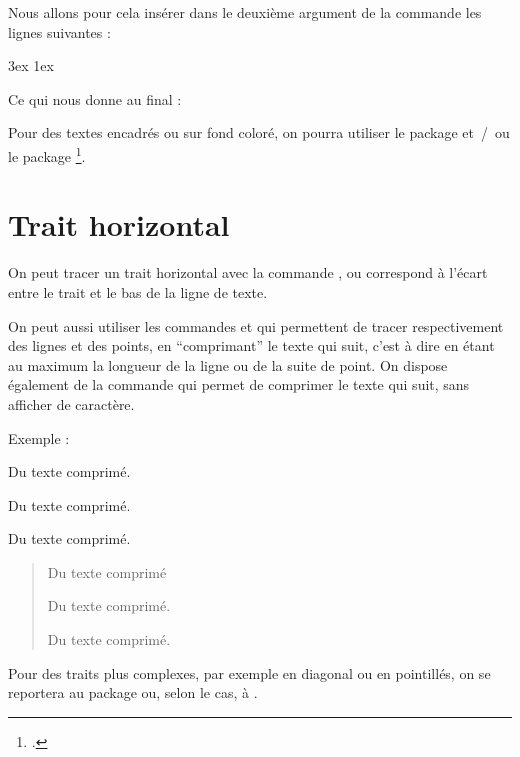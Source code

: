 Nous allons pour cela insérer dans le deuxième argument de la commande  les lignes suivantes :
\begin{latexcode}
\leftmargin 3ex
\rightmargin 1ex
\itshape
\end{latexcode}

Ce qui nous donne au final :

\begin{latexcode}
\makeatletter
\newenvironment{exemple}
               {\list{}{\listparindent 1.5em%
                        \itemindent    \listparindent
                        \leftmargin 3ex
		    \rightmargin 1ex
		    \itshape
                        \parsep        \z@ \@plus\p@}%
                \item\relax}
               {\endlist}
\makeatother
\end{latexcode}

\begin{plusloins}
Pour des textes encadrés ou sur fond coloré, on pourra utiliser le package  et~/~ou le package \footcites[On peut également consulter][qui regorge d'exemple pratique de \enquote{mise en boîte}]{frama}[on consultera en particulier][]{frama_boites}. 
\end{plusloins}

\section{Trait horizontal}\label{filets}

On peut tracer un trait horizontal avec la commande , ou  correspond à l'écart entre le trait et le bas de la ligne de texte.

On peut aussi utiliser les commandes  et  qui permettent de tracer respectivement des lignes et des points, en \enquote{comprimant} le texte qui suit, c'est à dire en étant au maximum la longueur de la ligne ou de la suite de point. On dispose également de la commande \label{hfill} qui permet de comprimer le texte qui suit, sans afficher de caractère.

Exemple :
\begin{latexcode}
\hfill	Du texte comprimé.

\hrulefill Du texte comprimé.

\dotfill Du texte comprimé.
\end{latexcode}

\begin{quotation}
\hfill Du texte comprimé

\hrulefill Du texte comprimé.

\dotfill Du texte comprimé.
\end{quotation}

Pour des traits plus complexes, par exemple en diagonal ou en pointillés, on se reportera au package  ou, selon le cas, à . 



